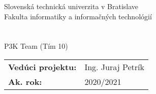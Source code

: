 \newcommand{\fiitmark}{%
\large
\textnormal{%
Slovenská technická univerzita v Bratislave \\
\vspace*{.25cm}
Fakulta informatiky a informačných technológií} \\
}

\begin{titlepage}
        \begin{center}
            \vspace*{.5cm}
            \fiitmark

            \vfill
            \huge
            \textbf{\documenttitle} \\

            \vspace*{.25cm}
            \large
            \textbf{\documentsubtitle} \\

            \vspace*{.25cm}
            \textnormal{P3K Team (Tím 10)} \\

        \end{center}

        \vfill

        \begin{table}[h]
            \begin{tabular}{ll}
                \textbf{Vedúci projektu:} & Ing. Juraj Petrík \\
                \textbf{Ak. rok:}  & 2020/2021 \\
            \end{tabular}
            \label{tab:grades}
        \end{table}
\end{titlepage}
